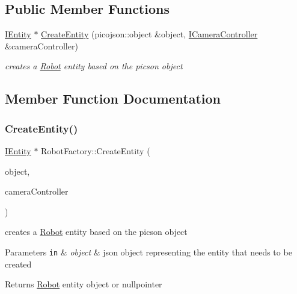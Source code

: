 \subsection*{Public Member Functions}
\begin{DoxyCompactItemize}
\item 
\hyperlink{classIEntity}{I\+Entity} $\ast$ \hyperlink{classRobotFactory_abcf3e19faf1d87fe2393b275b07c3549}{Create\+Entity} (picojson\+::object \&object, \hyperlink{classICameraController}{I\+Camera\+Controller} \&camera\+Controller)
\begin{DoxyCompactList}\small\item\em creates a \hyperlink{classRobot}{Robot} entity based on the picson object \end{DoxyCompactList}\end{DoxyCompactItemize}


\subsection{Member Function Documentation}
\mbox{\label{classRobotFactory_abcf3e19faf1d87fe2393b275b07c3549}} 
\subsubsection{\texorpdfstring{Create\+Entity()}{CreateEntity()}}
{\footnotesize\ttfamily \hyperlink{classIEntity}{I\+Entity} $\ast$ Robot\+Factory\+::\+Create\+Entity (\begin{DoxyParamCaption}\item[{picojson\+::object \&}]{object,  }\item[{\hyperlink{classICameraController}{I\+Camera\+Controller} \&}]{camera\+Controller }\end{DoxyParamCaption})\hspace{0.3cm}{\ttfamily [virtual]}}



creates a \hyperlink{classRobot}{Robot} entity based on the picson object 


\begin{DoxyParams}[1]{Parameters}
\mbox{\tt in}  & {\em object} & json object representing the entity that needs to be created\\
\hline
\end{DoxyParams}
\begin{DoxyReturn}{Returns}
\hyperlink{classRobot}{Robot} entity object or nullpointer 
\end{DoxyReturn}



